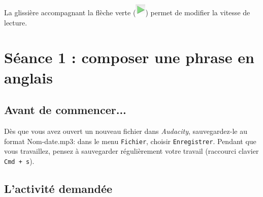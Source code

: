 \begin{itemize}


La glissière accompagnant la flèche verte (\includegraphics[angle=0,width=.4cm]{./images/son01/fleche_verte}) permet de modifier la vitesse de lecture.

\end{itemize}










%
%
%
%

\newpage

\section{Séance 1 : composer une phrase en anglais}\label{ficheSon5e1}

\subsection{Avant de commencer...}

Dès que vous avez ouvert un nouveau fichier dans \emph{Audacity}, sauvegardez-le au format Nom-date.mp3: dans le menu \texttt{Fichier}, choisir \texttt{Enregistrer}. Pendant que vous travaillez, pensez à sauvegarder régulièrement votre travail (raccourci clavier \texttt{Cmd + s}).   



\subsection{L'activité demandée}

